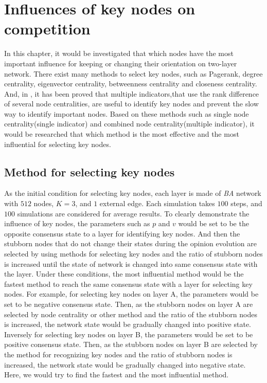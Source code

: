 
\chapter{Influences of key nodes on competition}
\label{chap5}
In this chapter, it would be investigated that which nodes have the most important influence for keeping or changing their orientation on two-layer network. There exist many methods to select key nodes, such as Pagerank, degree centrality, eigenvector centrality, betweenness centrality and closeness centrality. And, in \parencite{mesgari2015, huang2014}, it has been proved that multiple indicators,that use the rank difference of several node centralities, are useful to identify key nodes and prevent the slow way to identify important nodes. Based on these methods such as single node centrality(single indicator) and combined node centrality(multiple indicator), it would be researched that which method is the most effective and the most influential for selecting key nodes.  

\section{Method for selecting key nodes}
\label{sec:method for finding key nodes}
As the initial condition for selecting key nodes, each layer is made of \textit{BA} network with $512$ nodes, $K=3$, and $1$ external edge. Each simulation takes $100$ steps, and $100$ simulations are considered for average results. To clearly demonstrate the influence of key nodes, the parameters such as $p$ and $v$ would be set to be the opposite consensus state to a layer for identifying key nodes. And then the stubborn nodes that do not change their states during the opinion evolution are selected by using methods for selecting key nodes and the ratio of stubborn nodes is increased until the state of network is changed into same consensus state with the layer. Under these conditions, the most influential method would be the fastest method to reach the same consensus state with a layer for selecting key nodes. For example, for selecting key nodes on layer A, the parameters would be set to be negative consensus state. Then, as the stubborn nodes on layer A are selected by node centrality or other method and the ratio of the stubborn nodes is increased, the network state would be gradually changed into positive state. Inversely for selecting key nodes on layer B, the parameters would be set to be positive consensus state. Then, as the stubborn nodes on layer B are selected by the method for recognizing key nodes and the ratio of stubborn nodes is increased, the network state would be gradually changed into negative state. Here, we would try to find the fastest and the most influential method.

